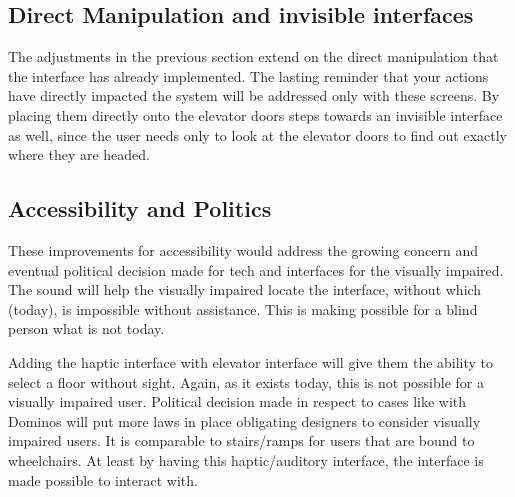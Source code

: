 \subsection{Direct Manipulation and invisible interfaces}
The adjustments in the previous section extend on the direct manipulation that the interface has already implemented. The lasting reminder that your actions have directly impacted the system will be addressed only with these screens. By placing them directly onto the elevator doors steps towards an invisible interface as well, since the user needs only to look at the elevator doors to find out exactly where they are headed.

\subsection{Accessibility and Politics}
These improvements for accessibility would address the growing concern and eventual political decision made for tech and interfaces for the visually impaired. The sound will help the visually impaired locate the interface, without which (today), is impossible without assistance. This is making possible for a blind person what is not today.

Adding the haptic interface with elevator interface will give them the ability to select a floor without sight. Again, as it exists today, this is not possible for a visually impaired user. Political decision made in respect to cases like with Dominos will put more laws in place obligating designers to consider visually impaired users. It is comparable to stairs/ramps for users that are bound to wheelchairs. At least by having this haptic/auditory interface, the interface is made possible to interact with.


